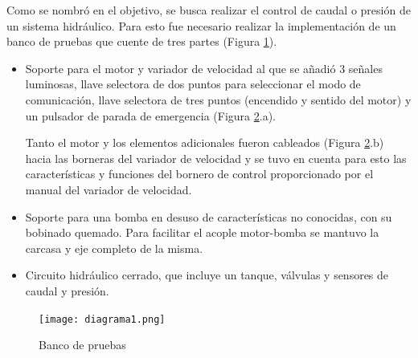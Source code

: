 Como se nombró en el objetivo, se busca realizar el control de caudal o presión de un sistema hidráulico. Para esto fue necesario realizar la implementación de un banco de pruebas que cuente de tres partes (Figura \ref{fig:bancofull}).
\begin{itemize}
	\item Soporte para el motor y variador de velocidad al que se añadió 3 señales luminosas, llave selectora de dos puntos para seleccionar el modo de comunicación, llave selectora de tres puntos (encendido y sentido del motor) y un pulsador de parada de emergencia (Figura \ref{fig:banco}.a).

	Tanto el motor y los elementos adicionales fueron cableados (Figura \ref{fig:banco}.b) hacia las borneras del variador de velocidad y se tuvo en cuenta para esto las características y funciones del bornero de control proporcionado por el manual del variador de velocidad\cite{InstaManual}. 
	
	\item Soporte para una bomba en desuso de características no conocidas, con su bobinado quemado. Para facilitar el acople motor-bomba se mantuvo la carcasa y eje completo de la misma.
	\item Circuito hidráulico cerrado, que incluye un tanque, válvulas y sensores de caudal y presión.
\end{itemize}



\begin{figure}[h!]
	\centering
	\texttt{[image: diagrama1.png]}
	\label{fig:bancofull}
\end{figure}


\begin{figure}[H]
	\centering
	\caption{Banco de pruebas} \label{fig:banco}
\end{figure}

